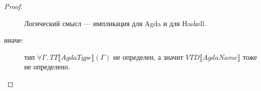 \begin{proof}
\begin{description}
   Логический смысл --- импликация для Agda и для Haskell.
\item[\textnormal{иначе}:]
   тип \(\forall \Gamma.\ TT\llbracket AgdaType \rrbracket(\Gamma)\)
   не определен, а значит \(VTD\llbracket AgdaName \rrbracket\) тоже
   не определено.
\end{description}
\end{proof}
